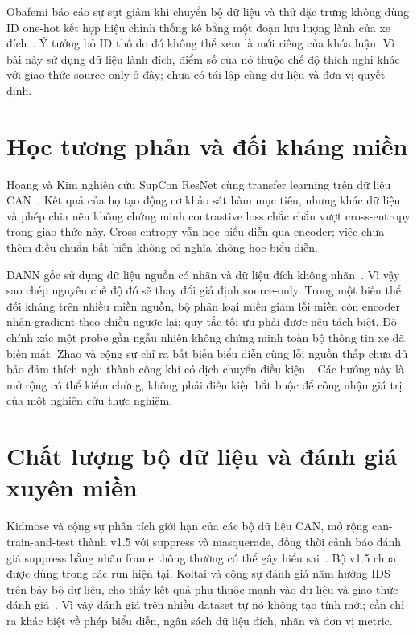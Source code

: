 \documentclass[12pt,a4paper,oneside,openany]{extbook}
\begin{document}
Obafemi báo cáo sự sụt giảm khi chuyển bộ dữ liệu và thử đặc trưng không dùng ID one-hot kết hợp hiệu chỉnh thống kê bằng một đoạn lưu lượng lành của xe đích~\cite{obafemi2026travel}. Ý tưởng bỏ ID thô do đó không thể xem là mới riêng của khóa luận. Vì bài này sử dụng dữ liệu lành đích, điểm số của nó thuộc chế độ thích nghi khác với giao thức source-only ở đây; chưa có tái lập cùng dữ liệu và đơn vị quyết định.

\section{Học tương phản và đối kháng miền}
Hoang và Kim nghiên cứu SupCon ResNet cùng transfer learning trên dữ liệu CAN~\cite{hoang2022supcon}. Kết quả của họ tạo động cơ khảo sát hàm mục tiêu, nhưng khác dữ liệu và phép chia nên không chứng minh contrastive loss chắc chắn vượt cross-entropy trong giao thức này. Cross-entropy vẫn học biểu diễn qua encoder; việc chưa thêm điều chuẩn bất biến không có nghĩa không học biểu diễn.

DANN gốc sử dụng dữ liệu nguồn có nhãn và dữ liệu đích không nhãn~\cite{ganin2016dann}. Vì vậy sao chép nguyên chế độ đó sẽ thay đổi giả định source-only. Trong một biến thể đối kháng trên nhiều miền nguồn, bộ phân loại miền giảm lỗi miền còn encoder nhận gradient theo chiều ngược lại; quy tắc tối ưu phải được nêu tách biệt. Độ chính xác một probe gần ngẫu nhiên không chứng minh toàn bộ thông tin xe đã biến mất. Zhao và cộng sự chỉ ra bất biến biểu diễn cùng lỗi nguồn thấp chưa đủ bảo đảm thích nghi thành công khi có dịch chuyển điều kiện~\cite{zhao2019invariant}. Các hướng này là mở rộng có thể kiểm chứng, không phải điều kiện bắt buộc để công nhận giá trị của một nghiên cứu thực nghiệm.

\section{Chất lượng bộ dữ liệu và đánh giá xuyên miền}
Kidmose và cộng sự phân tích giới hạn của các bộ dữ liệu CAN, mở rộng can-train-and-test thành v1.5 với suppress và masquerade, đồng thời cảnh báo đánh giá suppress bằng nhãn frame thông thường có thể gây hiểu sai~\cite{kidmose2025cansleuth}. Bộ v1.5 chưa được dùng trong các run hiện tại. Koltai và cộng sự đánh giá năm hướng IDS trên bảy bộ dữ liệu, cho thấy kết quả phụ thuộc mạnh vào dữ liệu và giao thức đánh giá~\cite{koltai2026trust}. Vì vậy đánh giá trên nhiều dataset tự nó không tạo tính mới; cần chỉ ra khác biệt về phép biểu diễn, ngân sách dữ liệu đích, nhãn và đơn vị metric.
\end{document}
